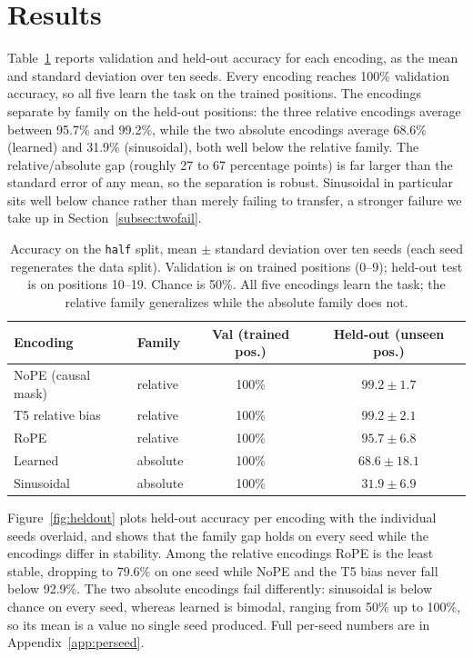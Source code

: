 \documentclass{article}
\begin{document}
\section{Results}

Table~\ref{tab:main} reports validation and held-out accuracy for each encoding,
as the mean and standard deviation over ten seeds. Every encoding reaches 100\%
validation accuracy, so all five learn the task on the trained positions. The encodings separate by family
on the held-out positions: the three relative encodings average between 95.7\% and
99.2\%, while the two absolute encodings average 68.6\% (learned) and 31.9\%
(sinusoidal), both well below the relative family. The relative/absolute gap
(roughly 27 to 67 percentage points) is far larger than the standard error of any
mean, so the separation is robust. Sinusoidal in particular sits well below chance
rather than merely failing to transfer, a stronger failure we take up in
Section~\ref{subsec:twofail}.

\begin{table}[t]
  \centering
  \caption{Accuracy on the \texttt{half} split, mean $\pm$ standard deviation over
  ten seeds (each seed regenerates the data split). Validation is on trained
  positions (0--9); held-out test is on positions 10--19. Chance is 50\%. All five
  encodings learn the task; the relative family generalizes while the absolute
  family does not.}
  \label{tab:main}
  \begin{tabular}{llcc}
    \toprule
    Encoding & Family & Val (trained pos.) & Held-out (unseen pos.) \\
    \midrule
    NoPE (causal mask) & relative & 100\% & $99.2 \pm 1.7$ \\
    T5 relative bias   & relative & 100\% & $99.2 \pm 2.1$ \\
    RoPE               & relative & 100\% & $95.7 \pm 6.8$ \\
    Learned            & absolute & 100\% & $68.6 \pm 18.1$ \\
    Sinusoidal         & absolute & 100\% & $31.9 \pm 6.9$ \\
    \bottomrule
  \end{tabular}
\end{table}

Figure~\ref{fig:heldout} plots held-out accuracy per encoding with the individual
seeds overlaid, and shows that the family gap holds on every seed while the
encodings differ in stability. Among the relative encodings RoPE is the least
stable, dropping to 79.6\% on one seed while NoPE and the T5 bias never fall below
92.9\%. The two absolute encodings fail differently: sinusoidal is below chance on
every seed, whereas learned is bimodal, ranging from 50\% up to 100\%, so its mean
is a value no single seed produced. Full per-seed numbers are in
Appendix~\ref{app:perseed}.
\end{document}
